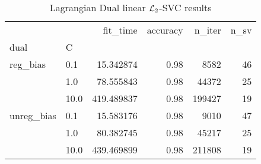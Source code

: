 \begin{table}[H]
\centering
\caption{Lagrangian Dual linear $\protect \mathcal{L}_2$-SVC results}
\label{linear_lagrangian_dual_l2_svc_cv_results}
\begin{tabular}{llrrrr}
\toprule
           &      &    fit\_time &  accuracy &  n\_iter &  n\_sv \\
dual & C &             &           &         &       \\
\midrule
reg\_bias & 0.1  &   15.342874 &      0.98 &    8582 &    46 \\
           & 1.0  &   78.555843 &      0.98 &   44372 &    25 \\
           & 10.0 &  419.489837 &      0.98 &  199427 &    19 \\
unreg\_bias & 0.1  &   15.583176 &      0.98 &    9010 &    47 \\
           & 1.0  &   80.382745 &      0.98 &   45217 &    25 \\
           & 10.0 &  439.469899 &      0.98 &  211808 &    19 \\
\bottomrule
\end{tabular}
\end{table}
